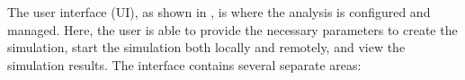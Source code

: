 The user interface (UI), as shown in , is where the analysis
is configured and managed. Here, the user is able to provide the necessary
parameters to create the simulation, start the simulation both locally and
remotely, and view the simulation results. The interface contains several
separate areas:


